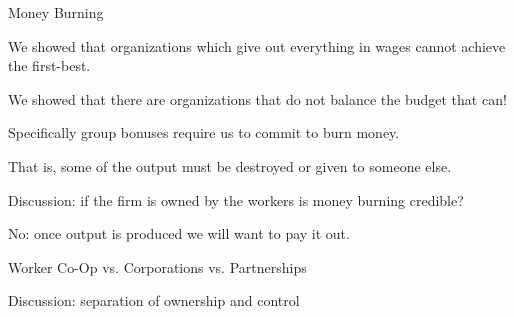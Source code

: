 \documentclass[aspectratio=169,usenames,dvipsnames]{beamer}
\newenvironment{wideitemize}{\itemize\addtolength{\itemsep}{10pt}}{\enditemize}
\begin{document}
\begin{frame}{Money Burning}

\begin{wideitemize}
    \item We showed that organizations which give out everything in wages cannot achieve the first-best.
    
    \item We showed that there are organizations that do not balance the budget that can!

    \item Specifically group bonuses require us to commit to burn money.
    \item That is, some of the output must be destroyed or given to someone else.
    \item Discussion: if the firm is owned by the workers is money burning credible?
    \pause

    \item No: once output is produced we will want to pay it out.
\end{wideitemize}
    
\end{frame}

\begin{frame}{Worker Co-Op vs. Corporations vs. Partnerships}

\huge Discussion: separation of ownership and control
    
\end{frame}
\end{document}
